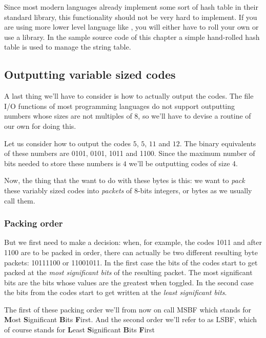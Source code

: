 Since most modern languages already implement some sort of hash table
in their standard library, this functionality should not be very hard
to implement. If you are using more lower level language like \C, you
will either have to roll your own or use a library. In the sample \C
source code of this chapter a simple hand-rolled hash table
is used to manage the string table.

\subsection{Outputting variable sized codes}

A last thing we'll have to consider is how to actually output the
codes. The file I/O functions of most programming languages do not
support outputting numbers whose sizes are not multiples of 8, so
we'll have to devise a routine of our own for doing this.

Let us consider how to output the codes $5$, $5$, $11$ and $12$. The
binary equivalents of these numbers are 0101, 0101, 1011 and
1100. Since the maximum number of bits needed to store these numbers
is $4$ we'll be outputting codes of size 4.

Now, the thing that the want to do with these bytes is this: we want
to \textit{pack} these variably sized codes into
\textit{packets} of 8-bits integers, or bytes as we
usually call them.

\subsubsection{Packing order}

But we first need to make a decision: when, for example, the codes
1011 and after 1100 are to be packed in order, there can actually be two
different resulting byte packets: 10111100 or 11001011. In the first
case the bits of the codes start to get packed at the \textit{most
  significant bits} of the resulting packet.  The most significant
bits are the bits whose values are the greatest when toggled. In the
second case the bits from the codes start to get written at the
\textit{least significant bits}.

The first of these packing order we'll from now on call
MSBF which stands for \textbf{M}ost \textbf{S}ignificant
\textbf{B}its \textbf{F}irst. And the second order we'll refer to as
LSBF, which of course stands for \textbf{L}east
\textbf{S}ignificant \textbf{B}its \textbf{F}irst


